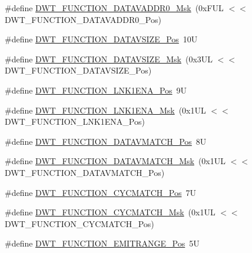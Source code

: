\begin{DoxyCompactItemize}
\item 
\#define \hyperlink{group___c_m_s_i_s___d_w_t_gafc5efbe8f9b51e04aecd00c8a4eb50fb}{D\+W\+T\+\_\+\+F\+U\+N\+C\+T\+I\+O\+N\+\_\+\+D\+A\+T\+A\+V\+A\+D\+D\+R0\+\_\+\+Msk}~(0x\+F\+U\+L $<$$<$ D\+W\+T\+\_\+\+F\+U\+N\+C\+T\+I\+O\+N\+\_\+\+D\+A\+T\+A\+V\+A\+D\+D\+R0\+\_\+\+Pos)
\item 
\#define \hyperlink{group___c_m_s_i_s___d_w_t_ga0517a186d4d448aa6416440f40fe7a4d}{D\+W\+T\+\_\+\+F\+U\+N\+C\+T\+I\+O\+N\+\_\+\+D\+A\+T\+A\+V\+S\+I\+Z\+E\+\_\+\+Pos}~10U
\item 
\#define \hyperlink{group___c_m_s_i_s___d_w_t_gaab42cbc1e6084c44d5de70971613ea76}{D\+W\+T\+\_\+\+F\+U\+N\+C\+T\+I\+O\+N\+\_\+\+D\+A\+T\+A\+V\+S\+I\+Z\+E\+\_\+\+Msk}~(0x3\+U\+L $<$$<$ D\+W\+T\+\_\+\+F\+U\+N\+C\+T\+I\+O\+N\+\_\+\+D\+A\+T\+A\+V\+S\+I\+Z\+E\+\_\+\+Pos)
\item 
\#define \hyperlink{group___c_m_s_i_s___d_w_t_ga89d7c48858b4d4de96cdadfac91856a1}{D\+W\+T\+\_\+\+F\+U\+N\+C\+T\+I\+O\+N\+\_\+\+L\+N\+K1\+E\+N\+A\+\_\+\+Pos}~9U
\item 
\#define \hyperlink{group___c_m_s_i_s___d_w_t_ga64bd419260c3337cacf93607d1ad27ac}{D\+W\+T\+\_\+\+F\+U\+N\+C\+T\+I\+O\+N\+\_\+\+L\+N\+K1\+E\+N\+A\+\_\+\+Msk}~(0x1\+U\+L $<$$<$ D\+W\+T\+\_\+\+F\+U\+N\+C\+T\+I\+O\+N\+\_\+\+L\+N\+K1\+E\+N\+A\+\_\+\+Pos)
\item 
\#define \hyperlink{group___c_m_s_i_s___d_w_t_ga106f3672cd4be7c7c846e20497ebe5a6}{D\+W\+T\+\_\+\+F\+U\+N\+C\+T\+I\+O\+N\+\_\+\+D\+A\+T\+A\+V\+M\+A\+T\+C\+H\+\_\+\+Pos}~8U
\item 
\#define \hyperlink{group___c_m_s_i_s___d_w_t_ga32af1f1c0fcd2d8d9afd1ad79cd9970e}{D\+W\+T\+\_\+\+F\+U\+N\+C\+T\+I\+O\+N\+\_\+\+D\+A\+T\+A\+V\+M\+A\+T\+C\+H\+\_\+\+Msk}~(0x1\+U\+L $<$$<$ D\+W\+T\+\_\+\+F\+U\+N\+C\+T\+I\+O\+N\+\_\+\+D\+A\+T\+A\+V\+M\+A\+T\+C\+H\+\_\+\+Pos)
\item 
\#define \hyperlink{group___c_m_s_i_s___d_w_t_ga4b65d79ca37ae8010b4a726312413efd}{D\+W\+T\+\_\+\+F\+U\+N\+C\+T\+I\+O\+N\+\_\+\+C\+Y\+C\+M\+A\+T\+C\+H\+\_\+\+Pos}~7U
\item 
\#define \hyperlink{group___c_m_s_i_s___d_w_t_ga8e2ed09bdd33a8f7f7ce0444f5f3bb25}{D\+W\+T\+\_\+\+F\+U\+N\+C\+T\+I\+O\+N\+\_\+\+C\+Y\+C\+M\+A\+T\+C\+H\+\_\+\+Msk}~(0x1\+U\+L $<$$<$ D\+W\+T\+\_\+\+F\+U\+N\+C\+T\+I\+O\+N\+\_\+\+C\+Y\+C\+M\+A\+T\+C\+H\+\_\+\+Pos)
\item 
\#define \hyperlink{group___c_m_s_i_s___d_w_t_ga41d5b332216baa8d29561260a1b85659}{D\+W\+T\+\_\+\+F\+U\+N\+C\+T\+I\+O\+N\+\_\+\+E\+M\+I\+T\+R\+A\+N\+G\+E\+\_\+\+Pos}~5U
$$
\end{DoxyCompactItemize}
